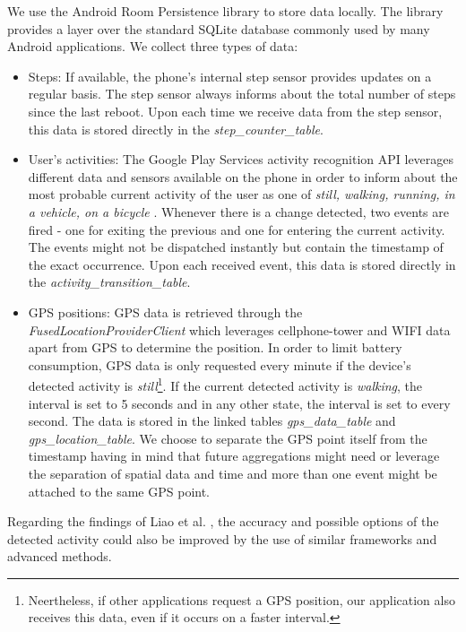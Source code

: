 We use the Android Room Persistence library \parencite{room} to store data locally. The library provides a layer over the standard SQLite database commonly used by many Android applications. We collect three types of data:
\begin{itemize}
	\item Steps: If available, the phone's internal step sensor provides updates on a regular basis. The step sensor always informs about the total number of steps since the last reboot. Upon each time we receive data from the step sensor, this data is stored directly in the \textit{step\_counter\_table}.
	\item User's activities: The Google Play Services  activity recognition API leverages different data and sensors available on the phone in order to inform about the most probable current activity of the user as one of \textit{still, walking, running, in a vehicle, on a bicycle} \parencite{detected-activity}. Whenever there is a change detected, two events are fired - one for exiting the previous and one for entering the current activity. The events might not be dispatched instantly but contain the timestamp of the exact occurrence. Upon each received event, this data is stored directly in the \textit{activity\_transition\_table}.
	\item GPS positions: GPS data is retrieved through the \textit{FusedLocationProviderClient} which leverages cellphone-tower and WIFI data apart from GPS to determine the position. In order to limit battery consumption, GPS data is only requested every minute if the device's detected activity is \textit{still}\footnote{Neertheless, if other applications request a GPS position, our application also receives this data, even if it occurs on a faster interval.}. If the current detected activity is \textit{walking}, the interval is set to 5 seconds and in any other state, the interval is set to every second. The data is stored in the linked tables \textit{gps\_data\_table} and \textit{gps\_location\_table}. We choose to separate the GPS point itself from the timestamp having in mind that future aggregations might need or leverage the separation of spatial data and time and more than one event might be attached to the same GPS point.
\end{itemize}

Regarding the findings of Liao et al. \parencite{liao2005location}, the accuracy and possible options of the detected activity could also be improved by the use of similar frameworks and advanced methods.

